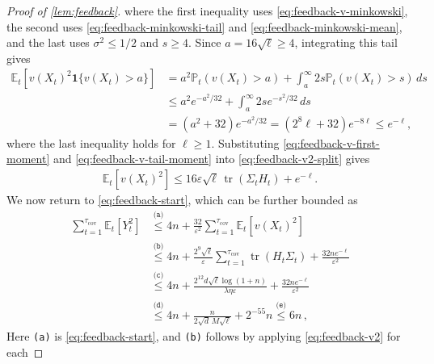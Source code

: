 \documentclass[11pt]{article}
\newcommand{\reason}[1]{\texttt{(#1)}}
\newcommand{\explan}[2]{\stackrel{\reason{#2}}{#1}}
\newcommand{\E}{\mathbb E}
\newcommand{\Pp}{\mathbb P}
\newcommand{\tr}{\operatorname{tr}}
\newcommand{\1}{\mathbf 1}
\newcommand{\eps}{\varepsilon}
\begin{document}
\begin{proof}[Proof of \cref{lem:feedback}]
    where the first inequality uses \eqref{eq:feedback-v-minkowski},
    the second uses \eqref{eq:feedback-minkowski-tail} and
    \eqref{eq:feedback-minkowski-mean}, and the last uses $\sigma^2\leq1/2$ and $s\geq4$.
    Since $a=16\sqrt\ell\geq4$, integrating this tail gives
    \begin{align}
        \E_t\left[
            v(X_t)^2\1\{v(X_t)>a\}
            \right]
         & =
        a^2\Pp_t(v(X_t)>a)
        +
        \int_a^\infty
        2s\Pp_t(v(X_t)>s)\,ds
        \nonumber \\
         & \leq
        a^2e^{-a^2/32}
        +
        \int_a^\infty2se^{-s^2/32}\,ds
        \nonumber \\
         & =
        (a^2+32)e^{-a^2/32}
        =
        (2^8\ell+32)e^{-8\ell}
        \leq
        e^{-\ell},
        \label{eq:feedback-v-tail-moment}
    \end{align}
    where the last inequality holds for $\ell\geq1$.
    Substituting
    \eqref{eq:feedback-v-first-moment} and
    \eqref{eq:feedback-v-tail-moment} into
    \eqref{eq:feedback-v2-split} gives
    \begin{align}
        \E_t[v(X_t)^2]
        \leq
        16\eps\sqrt\ell\,
        \tr(\Sigma_tH_t)
        +
        e^{-\ell}.
        \label{eq:feedback-v2}
    \end{align}
    We now return to \eqref{eq:feedback-start}, which can be further bounded as
    \begin{align}
        \sum_{t=1}^{\tau_{\mathrm{cov}}}\E_t[Y_t^2]
         & \explan{\leq}{a}
        4n
        +
        \frac{32}{\eps^2}
        \sum_{t=1}^{\tau_{\mathrm{cov}}}
        \E_t[v(X_t)^2]
        \\
         & \explan{\leq}{b}
        4n
        +
        \frac{2^9\sqrt\ell}{\eps}
        \sum_{t=1}^{\tau_{\mathrm{cov}}}
        \tr(H_t\Sigma_t)
        +
        \frac{32ne^{-\ell}}{\eps^2}
        \\
         & \explan{\leq}{c}
        4n
        +
        \frac{2^{12}d\sqrt\ell\log(1+n)}
        {\lambda\eta\eps}
        +
        \frac{32ne^{-\ell}}{\eps^2}
        \\
         & \explan{\leq}{d}
        4n
        +\frac{n}{2\sqrt d\,M\sqrt\ell}
        +2^{-55}n
        \explan{\leq}{e}
        6n
        \,,
        \label{eq:feedback-predictable-before-parameters}
    \end{align}
    Here \reason{a} is \eqref{eq:feedback-start}, and
    \reason{b} follows by applying \eqref{eq:feedback-v2} for each

\end{proof}
\end{document}
